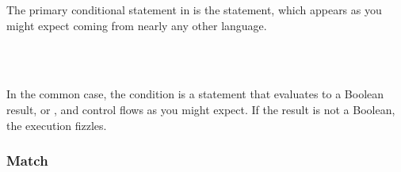 The primary conditional statement in \Prose{} is the  statement,
which appears as you might expect coming from nearly any other language.

\begin{bnf*}
     \\
     \\
\end{bnf*}

In the common case, the condition is a statement that evaluates to a Boolean
result,  or , and control flows as you might expect.
If the result is not a Boolean, the execution fizzles.

\begin{prooftree}
\end{prooftree}
\begin{prooftree}
\end{prooftree}
\begin{prooftree}
\end{prooftree}
\begin{prooftree}
\end{prooftree}

\subsubsection{Match}

